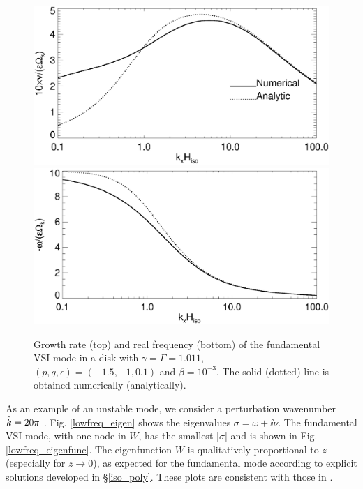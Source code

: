 \begin{figure}
  \includegraphics[width=\linewidth,clip=true,trim=0cm 1.75cm 0cm
  0cm]{figures/compare_eigen_imag_iso} 
  \includegraphics[width=\linewidth,clip=true,trim=0cm 0cm 0cm
  1cm]{figures/compare_eigen_real_iso}
  \caption{Growth rate (top) and real frequency (bottom) of the
    fundamental VSI mode in a disk with $\gamma=\Gamma=1.011$,
    $(p,q,\epsilon)=(-1.5,-1,0.1)$ and
    $\beta=10^{-3}$. The solid (dotted) line is obtained numerically
    (analytically).  
    \label{iso_eigen_kx} 
  }
\end{figure}

As an example of an unstable mode, we consider a perturbation
wavenumber $\hat{k}=20\pi$ \citep[or $k_x = 200\pi/r$ as used
in][]{mcnally14}. Fig. \ref{lowfreq_eigen} shows the eigenvalues
$\sigma = \omega + \ii\nu$. The fundamental VSI mode, with one node in $W$, has
the smallest $|\sigma|$ and is shown in Fig. \ref{lowfreq_eigenfunc}. 
The eigenfunction $W$ is qualitatively proportional to 
$z$ (especially for $z\to0$),  as expected for the fundamental mode
according to explicit solutions developed in \S\ref{iso_poly}.    
These plots are consistent with those in \cite{mcnally14}.  
 
